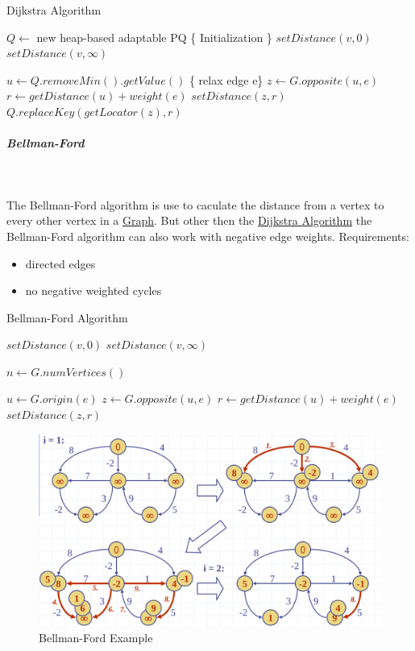 \documentclass[11pt,twoside,twocolumn,landscape]{article}
\begin{document}
\begin{algorithm}
  \caption{Dijkstra Algorithm}
  \begin{algorithmic}
    \State $Q \gets$ new heap-based adaptable PQ
    \State \{ Initialization \}
    \State $setDistance(v, 0)$
    \Else
    \State $setDistance(v, \infty)$
    \EndIf
    \EndFor

    \State $u \gets Q.removeMin().getValue()$
    \State \{ relax edge e\}
    \State $z \gets G.opposite(u, e)$
    \State $r \gets getDistance(u) + weight(e)$
    \State $setDistance(z,r)$
    \State $Q.replaceKey(getLocator(z), r)$
    \EndIf
    \EndFor
    \EndWhile
    \EndProcedure
  \end{algorithmic}
\end{algorithm}

\subparagraph{Bellman-Ford} \
\label{sec:orgab7b547}

The Bellman-Ford algorithm is use to caculate the distance from a vertex to every other vertex in a \href{../../../roam/20220201163000-graph.org}{Graph}.
But other then the \href{../../../roam/20220202132913-dijkstra_algorithm.org}{Dijkstra Algorithm} the Bellman-Ford algorithm can also work with negative edge weights.
Requirements:
\begin{itemize}
\item directed edges
\item no negative weighted cycles
\end{itemize}


\begin{algorithm}
  \caption{Bellman-Ford Algorithm}
  \begin{algorithmic}
    \State $setDistance(v, 0)$
    \Else
    \State $setDistance(v, \infty)$
    \EndIf
    \EndFor

    \State $n \gets G.numVertices()$

    \State $u \gets G.origin(e)$
    \State $z \gets G.opposite(u,e)$
    \State $r \gets getDistance(u) + weight(e)$
    \State $setDistance(z,r)$
    \EndIf
    \EndFor
    \EndFor
    \EndProcedure
  \end{algorithmic}
\end{algorithm}


\begin{figure}[htbp]
\centering
\includegraphics[width=.9\linewidth]{img/bellman_ford_example.png}
\caption{\label{fig:orgc468214}Bellman-Ford Example}
\end{figure}
\end{document}
